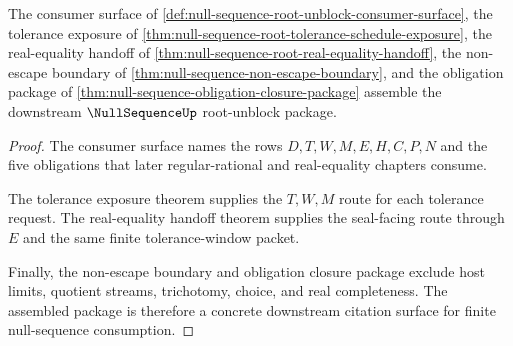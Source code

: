 \begin{theorem}
\label{thm:null-sequence-root-downstream-unblock-package}
The consumer surface of \autoref{def:null-sequence-root-unblock-consumer-surface}, the tolerance exposure of \autoref{thm:null-sequence-root-tolerance-schedule-exposure}, the real-equality handoff of \autoref{thm:null-sequence-root-real-equality-handoff}, the non-escape boundary of \autoref{thm:null-sequence-non-escape-boundary}, and the obligation package of \autoref{thm:null-sequence-obligation-closure-package} assemble the downstream $\NullSequenceUp$ root-unblock package.
\end{theorem}
\begin{proof}
The consumer surface names the rows $D,T,W,M,E,H,C,P,N$ and the five obligations that later regular-rational and real-equality chapters consume.

The tolerance exposure theorem supplies the $T,W,M$ route for each tolerance request. The real-equality handoff theorem supplies the seal-facing route through $E$ and the same finite tolerance-window packet.

Finally, the non-escape boundary and obligation closure package exclude host limits, quotient streams, trichotomy, choice, and real completeness. The assembled package is therefore a concrete downstream citation surface for finite null-sequence consumption.
\end{proof}

